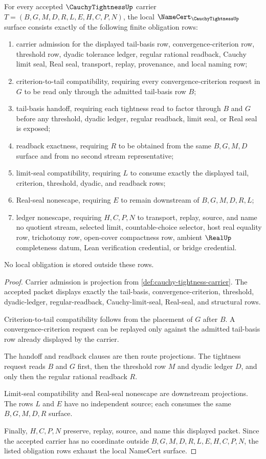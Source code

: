 \begin{theorem}
\label{thm:cauchy-tightness-namecert-obligations}
For every accepted $\CauchyTightnessUp$ carrier $T=(B,G,M,D,R,L,E,H,C,P,N)$, the local $\NameCert_{\CauchyTightnessUp}$ surface consists exactly of the following finite obligation rows:
\begin{enumerate}
\item carrier admission for the displayed tail-basis row, convergence-criterion row, threshold row, dyadic tolerance ledger, regular rational readback, Cauchy limit seal, Real seal, transport, replay, provenance, and local naming row;
\item criterion-to-tail compatibility, requiring every convergence-criterion request in $G$ to be read only through the admitted tail-basis row $B$;
\item tail-basis handoff, requiring each tightness read to factor through $B$ and $G$ before any threshold, dyadic ledger, regular readback, limit seal, or Real seal is exposed;
\item readback exactness, requiring $R$ to be obtained from the same $B,G,M,D$ surface and from no second stream representative;
\item limit-seal compatibility, requiring $L$ to consume exactly the displayed tail, criterion, threshold, dyadic, and readback rows;
\item Real-seal nonescape, requiring $E$ to remain downstream of $B,G,M,D,R,L$;
\item ledger nonescape, requiring $H,C,P,N$ to transport, replay, source, and name no quotient stream, selected limit, countable-choice selector, host real equality row, trichotomy row, open-cover compactness row, ambient $\RealUp$ completeness datum, Lean verification credential, or bridge credential.
\end{enumerate}
No local obligation is stored outside these rows.
\end{theorem}
\begin{proof}
Carrier admission is projection from \autoref{def:cauchy-tightness-carrier}. The accepted packet displays exactly the tail-basis, convergence-criterion, threshold, dyadic-ledger, regular-readback, Cauchy-limit-seal, Real-seal, and structural rows.

Criterion-to-tail compatibility follows from the placement of $G$ after $B$. A convergence-criterion request can be replayed only against the admitted tail-basis row already displayed by the carrier.

The handoff and readback clauses are then route projections. The tightness request reads $B$ and $G$ first, then the threshold row $M$ and dyadic ledger $D$, and only then the regular rational readback $R$.

Limit-seal compatibility and Real-seal nonescape are downstream projections. The rows $L$ and $E$ have no independent source; each consumes the same $B,G,M,D,R$ surface.

Finally, $H,C,P,N$ preserve, replay, source, and name this displayed packet. Since the accepted carrier has no coordinate outside $B,G,M,D,R,L,E,H,C,P,N$, the listed obligation rows exhaust the local NameCert surface.
\end{proof}

